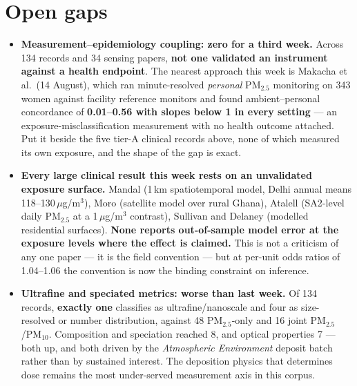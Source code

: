 \documentclass[10pt]{article}
\begin{document}
\clearpage

\section*{\sffamily\bfseries\color{Deep}Open gaps}
\vspace{-1.5mm}{\color{Teal}\rule{\linewidth}{1.1pt}}\vspace{2.5mm}

\footnotesize
\begin{itemize}
\item \textbf{Measurement--epidemiology coupling: zero for a third week.} Across 134
records and 34 sensing papers, \textbf{not one validated an instrument against a health
endpoint}. The nearest approach this week is Makacha et al.\ (14 August), which ran
minute-resolved \emph{personal} PM$_{2.5}$ monitoring on 343 women against facility
reference monitors and found ambient--personal concordance of \textbf{0.01--0.56 with
slopes below 1 in every setting} --- an exposure-misclassification measurement with no
health outcome attached. Put it beside the five tier-A clinical records above, none of
which measured its own exposure, and the shape of the gap is exact.

\item \textbf{Every large clinical result this week rests on an unvalidated exposure
surface.} Mandal (1\,km spatiotemporal model, Delhi annual means 118--130\,$\mu$g/m$^3$),
Moro (satellite model over rural Ghana), Atalell (SA2-level daily PM$_{2.5}$ at a
1\,$\mu$g/m$^3$ contrast), Sullivan and Delaney (modelled residential surfaces).
\textbf{None reports out-of-sample model error at the exposure levels where the effect is
claimed.} This is not a criticism of any one paper --- it is the field convention --- but
at per-unit odds ratios of 1.04--1.06 the convention is now the binding constraint on
inference.

\item \textbf{Ultrafine and speciated metrics: worse than last week.} Of 134 records,
\textbf{exactly one} classifies as ultrafine/nanoscale and four as size-resolved or number
distribution, against 48 PM$_{2.5}$-only and 16 joint PM$_{2.5}$/PM$_{10}$. Composition
and speciation reached 8, and optical properties 7 --- both up, and both driven by the
\textit{Atmospheric Environment} deposit batch rather than by sustained interest. The
deposition physics that determines dose remains the most under-served measurement axis in
this corpus.


\end{itemize}
\end{document}
